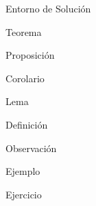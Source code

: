 \documentclass[12pt]{report}
\theoremstyle{largebreak}
\begin{document}
    \begin{sol}
        Entorno de Solución
    \end{sol}

    \begin{theor}[Nombre]
        Teorema
    \end{theor}

    \begin{propo}[Nombre]
        Proposición
    \end{propo}

    \begin{cor}[Nombre]
        Corolario
    \end{cor}

    \begin{lema}[Nombre]
        Lema
    \end{lema}

    \begin{mydef}[Nombre]
        Definición
    \end{mydef}

    \begin{obs}[Nombre]
        Observación
    \end{obs}

    \begin{exa}[Nombre]
        Ejemplo
    \end{exa}

    \begin{excer}[Nombre]
        Ejercicio
    \end{excer}
\end{document}
